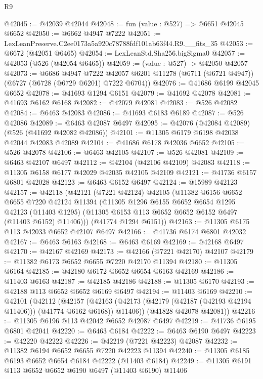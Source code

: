 \begin{lexlean}{R9}
\begin{coremodule}
@42045 := @42039 @42044
@42048 := fun (value : @527) => @6651 @42045 @6652
@42050 := @6662 @4947 @7222
@42051 := LexLeanPreserve.C2ee0173a5a920c78788fdf101ab63f44.R9.__fits_35
@42053 := @6672 (@42051 @6465)
@42054 := LexLeanStd.Sha256.bigSigma0
@42057 := @42053 (@526 (@42054 @6465))
@42059 := (value : @527) -> @42050 @42057
@42073 := @6686
    @4947
    @7222
    @42057
    @6201
    @11278
    (@6711 (@6721 @4947))
    (@6727 (@6728 (@6729 @6201) @7222 @6704))
@42076 := @41686 @6199 @42045 @6652
@42078 := @41693 @1294 @6151
@42079 := @41692 @42078
@42081 := @41693 @6162 @6168
@42082 := @42079 @42081
@42083 := @526 @42082
@42084 := @6463 @42083
@42086 := @41693 @6183 @6189
@42087 := @526 @42086
@42089 := @6463 @42087 @6497
@42095 := @42076 (@42084 @42089) (@526 (@41692 @42082 @42086))
@42101 := @11305 @6179 @6198 @42038 @42044 @42083 @42089
@42104 := @41686 @6178 @42036 @6652
@42105 := @526 @42078
@42106 := @6463 @42105
@42107 := @526 @42081
@42109 := @6463 @42107 @6497
@42112 := @42104 (@42106 @42109) @42083
@42118 := @11305 @6158 @6177 @42029 @42035 @42105 @42109
@42121 := @41736 @6157 @6801 @42028
@42123 := @6463 @6152 @6497
@42124 := @15989 @42123
@42157 := @42118
    (@42121
      (@7221 @42124)
      @42105
      (@11382
        @6156
        @6652
        @6655
        @7220
        @42124
        @11394
        (@11305
          @1296
          @6155
          @6652
          @6654
          @1295
          @42123
          (@11403 @1295)
          (@11305 @6153 @113 @6652 @6652 @6152 @6497 (@11403 @6152) @11406)))
      (@41774 @1294 @6151))
@42163 := @11305 @6175 @113 @42033 @6652 @42107 @6497
@42166 := @41736 @6174 @6801 @42032
@42167 := @6463 @6163
@42168 := @6463 @6169
@42169 := @42168 @6497
@42170 := @42167 @42169
@42173 := @42166 (@7221 @42170) @42107
@42179 := @11382 @6173 @6652 @6655 @7220 @42170 @11394
@42180 := @11305 @6164
@42185 := @42180 @6172 @6652 @6654 @6163 @42169
@42186 := @11403 @6163
@42187 := @42185 @42186
@42188 := @11305 @6170
@42193 := @42188 @113 @6652 @6652 @6169 @6497
@42194 := @11403 @6169
@42210 := @42101
    (@42112
      (@42157
        (@42163 (@42173 (@42179 (@42187 (@42193 @42194 @11406))) (@41774 @6162 @6168)) @11406))
      (@41828 @42078 @42081))
@42216 := @11305 @6196 @113 @42042 @6652 @42087 @6497
@42219 := @41736 @6195 @6801 @42041
@42220 := @6463 @6184
@42222 := @6463 @6190 @6497
@42223 := @42220 @42222
@42226 := @42219 (@7221 @42223) @42087
@42232 := @11382 @6194 @6652 @6655 @7220 @42223 @11394
@42240 := @11305 @6185 @6193 @6652 @6654 @6184 @42222 (@11403 @6184)
@42249 := @11305 @6191 @113 @6652 @6652 @6190 @6497 (@11403 @6190) @11406

\end{coremodule}
\end{lexlean}
